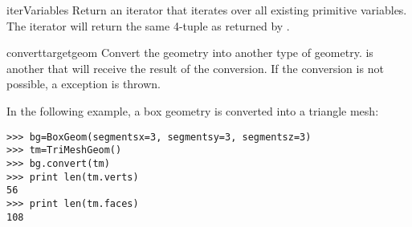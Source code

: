 \begin{methoddesc}{iterVariables}{}
Return an iterator that iterates over all existing primitive variables.
The iterator will return the same 4-tuple as returned by 
.
\end{methoddesc}

\begin{methoddesc}{convert}{targetgeom}
Convert the geometry into another type of geometry. 
is another  that will receive the result of the
conversion.  If the conversion is not possible, a
 exception is thrown.

In the following example, a box geometry is converted into a triangle
mesh:

\begin{verbatim}
>>> bg=BoxGeom(segmentsx=3, segmentsy=3, segmentsz=3)
>>> tm=TriMeshGeom()
>>> bg.convert(tm)
>>> print len(tm.verts)
56
>>> print len(tm.faces)
108
\end{verbatim}
\end{methoddesc}



